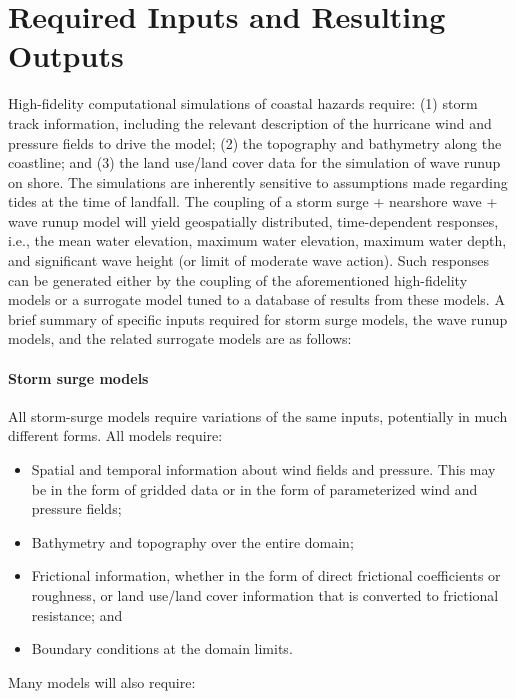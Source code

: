 \section{Required Inputs and Resulting Outputs}
\label{sec:storm_surge_io}

High-fidelity computational simulations of coastal hazards require: (1) storm track information, including the relevant description of the hurricane wind and pressure fields to drive the model; (2) the topography and bathymetry along the coastline; and (3) the land use/land cover data for the simulation of wave runup on shore. The simulations are inherently sensitive to assumptions made regarding tides at the time of landfall. The coupling of a storm surge + nearshore wave + wave runup model will yield geospatially distributed, time-dependent responses, i.e., the mean water elevation, maximum water elevation, maximum water depth, and significant wave height (or limit of moderate wave action). Such responses can be generated either by the coupling of the aforementioned high-fidelity models or a surrogate model tuned to a database of results from these models. A brief summary of specific inputs required for storm surge models, the wave runup models, and the related surrogate models are as follows:

\paragraph{Storm surge models} All storm-surge models require variations of the same inputs, potentially in much different forms. All models require:

\begin{itemize}
    \item Spatial and temporal information about wind fields and pressure. This may be in the form of gridded data or in the form of parameterized wind and pressure fields;

    \item Bathymetry and topography over the entire domain;

    \item Frictional information, whether in the form of direct frictional coefficients or roughness, or land use/land cover information that is converted to frictional resistance; and

    \item Boundary conditions at the domain limits.
\end{itemize}

\noindent
Many models will also require:

